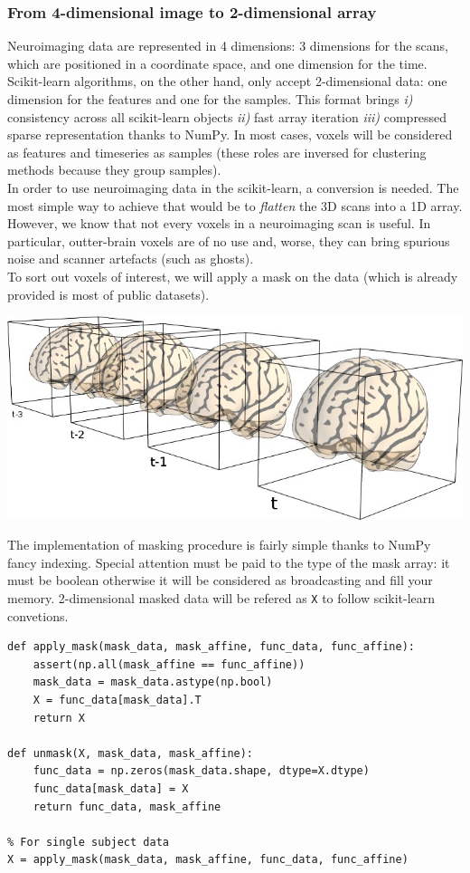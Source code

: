 \documentclass{frontiersSCNS} %
\begin{document}
\subsubsection{From 4-dimensional image to 2-dimensional array}

Neuroimaging data are represented in 4 dimensions: 3 dimensions for the scans,
which are positioned in a coordinate space, and one dimension for the time.
Scikit-learn algorithms, on the other hand, only accept 2-dimensional data: one
dimension for the features and one for the samples. This format brings \textit{i)}
consistency across all scikit-learn objects \textit{ii)} fast array iteration
\textit{iii)} compressed sparse representation thanks to NumPy.
In most
cases, voxels will be considered as features and timeseries as samples (these
roles are inversed for clustering methods because they group samples).\\


In order to use neuroimaging data in the scikit-learn, a
conversion is needed. The most simple way to achieve that would be to
\emph{flatten} the 3D scans into a 1D array. However, we know that not every
voxels in a neuroimaging scan is useful. In particular, outter-brain voxels are
of no use and, worse, they can bring spurious noise and scanner artefacts (such
as ghosts).\\

To sort out voxels of interest, we will apply a mask on the data (which is
already provided is most of public datasets).

\includegraphics[width=.5\linewidth]{img/niimgs.jpg}

The implementation of masking procedure is fairly simple thanks to NumPy fancy
indexing. Special attention must be paid to the type of the mask array: it must
be boolean otherwise it will be considered as broadcasting and fill your memory.
2-dimensional masked data will be refered as \texttt{X} to follow scikit-learn
convetions.

\begin{lstlisting}
def apply_mask(mask_data, mask_affine, func_data, func_affine):
    assert(np.all(mask_affine == func_affine))
    mask_data = mask_data.astype(np.bool)
    X = func_data[mask_data].T
    return X

def unmask(X, mask_data, mask_affine):
    func_data = np.zeros(mask_data.shape, dtype=X.dtype)
    func_data[mask_data] = X
    return func_data, mask_affine

% For single subject data
X = apply_mask(mask_data, mask_affine, func_data, func_affine)
\end{lstlisting}
\end{document}
